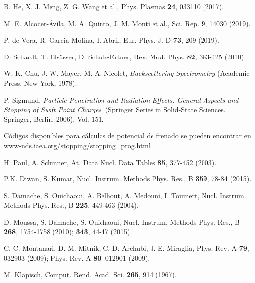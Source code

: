 \begin{thebibliography}{9}
B. He, X. J. Meng, Z. G. Wang et al., 
Phys. Plasmas \textbf{24}, 033110 (2017).

M. E. Alcocer-Ávila, M. A. Quinto, J. M. Monti et al.,
Sci. Rep. \textbf{9}, 14030 (2019).

P. de Vera, R. Garcia-Molina, I. Abril, 
Eur. Phys. J. D \textbf{73}, 209 (2019).

D. Schardt, T. Els\"asser, D. Schulz-Ertner, 
Rev. Mod. Phys. \textbf{82},  383-425 (2010).

W. K. Chu, J. W. Mayer, M. A. Nicolet,
\textit{Backscattering Spectrometry}
(Academic Press, New York, 1978).

P. Sigmund, 
\textit{Particle Penetration and Radiation Effects. General Aspects and 
Stopping of Swift Point Charges}.
(Springer Series in Solid-State Sciences, Springer, Berlin, 2006), Vol. 151.

Códigos disponibles para cálculos de potencial de frenado se pueden 
encontrar en \href{https://www-nds.iaea.org/stopping/stopping\_prog.html}
{www-nds.iaea.org/stopping/stopping\_prog.html}

H. Paul, A. Schinner,
At. Data Nucl. Data Tables  \textbf{85}, 377-452 (2003).

P.K. Diwan, S. Kumar, 
Nucl. Instrum. Methods Phys. Res., B \textbf{359}, 78-84 (2015).

S. Damache, S. Ouichaoui, A. Belhout, A. Medouni, I. Toumert, 
Nucl. Instrum. Methods Phys. Res., B \textbf{225}, 449-463 (2004).

D. Moussa, S. Damache, S. Ouichaoui, 
Nucl. Instrum. Methods Phys. Res., B \textbf{268}, 1754-1758 (2010); 
\textbf{343},  44-47 (2015).

C. C. Montanari, D. M. Mitnik, C. D. Archubi, J. E. Miraglia, 
Phys. Rev. A \textbf{79}, 032903 (2009); 
Phys. Rev. A \textbf{80}, 012901 (2009).

M. Klapisch,
Comput. Rend. Acad. Sci. \textbf{265}, 914 (1967).


\end{thebibliography}

